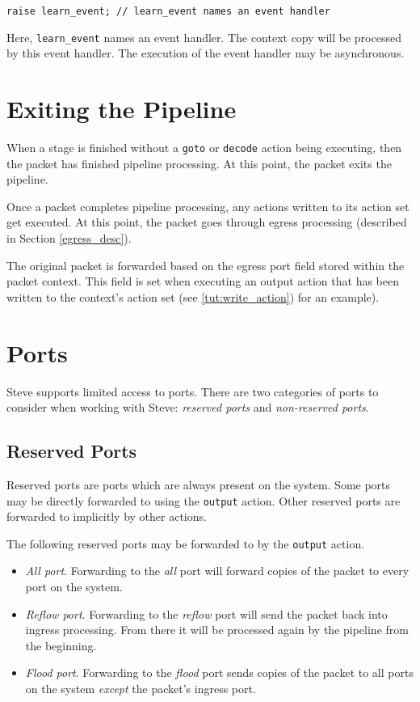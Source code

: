 \begin{lstlisting}
raise learn_event; // learn_event names an event handler 
\end{lstlisting}

Here, \texttt{learn\_event} names an event handler. The context copy
will be processed by this event handler. The execution of the event
handler may be asynchronous. 

\section{Exiting the Pipeline} \label{tut:pipeline_exit}

When a stage is finished without a \texttt{goto} or \texttt{decode}
action being executing, then the packet has finished pipeline
processing.
At this point, the packet exits the pipeline.

Once a packet completes pipeline processing, any actions written to its action
set get executed. 
At this point, the packet goes through egress processing (described in Section
\ref{egress_desc}).

The original packet is forwarded based on the egress port field stored
within the packet context. This field is set when executing an
output action that has been written to the context's action set
(see \ref{tut:write_action}) for an example).

\section{Ports} \label{tut:ports}

Steve supports limited access to ports.
There are two categories of ports to consider when working with Steve: 
\textit{reserved ports} and
\textit{non-reserved ports}.

\subsection {Reserved Ports} \label{tut:reserved_ports}

Reserved ports are ports which are always present on the system. Some ports may
be directly forwarded to using the \texttt{output} action. Other reserved ports 
are forwarded to implicitly by other actions.

The following reserved ports may be forwarded to by the \texttt{output} action.

\begin{itemize}
\item \emph{All port}. Forwarding to the \textit{all} port will forward copies of the packet to
every port on the system.

\item \emph{Reflow port}. Forwarding to the \textit{reflow} port will send the packet back into
ingress processing. From there it will be processed again by the pipeline from
the beginning.

\item \emph{Flood port}. Forwarding to the \textit{flood} port sends copies of the packet to all
ports on the system \textit{except} the packet's ingress port.
\end{itemize}

